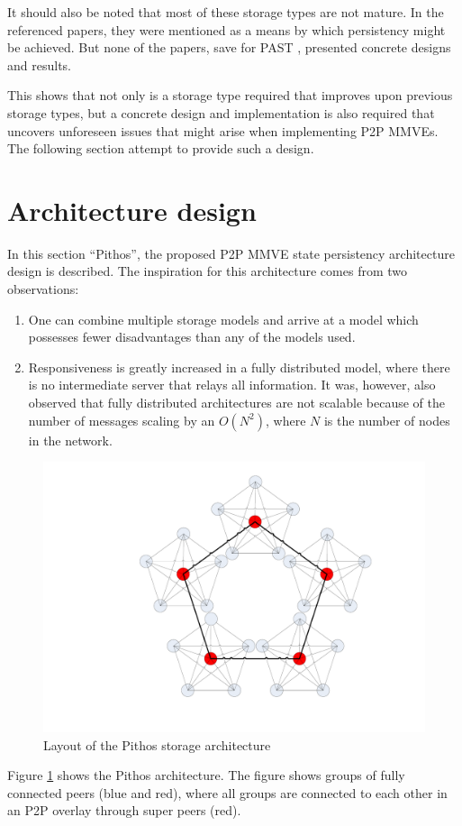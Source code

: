 \documentclass[10pt,a4paper,conference]{IEEEtran}
\begin{document}
It should also be noted that most of these storage types are not mature. In the referenced papers, they were mentioned as a means by which
persistency might be achieved. But none of the papers, save for PAST \cite{PAST_storage}, presented concrete designs and results.

This shows that not only is a storage type required that improves upon previous storage types, but a concrete design and implementation is also
required that uncovers unforeseen issues that might arise when implementing P2P MMVEs. The following section attempt to provide such a design.

\section{Architecture design}
\label{design}

In this section ``Pithos'', the proposed P2P MMVE state persistency architecture design is described. The inspiration for this architecture comes
from two observations:
%
\begin{enumerate}
  \item One can combine multiple storage models and arrive at a model which possesses fewer disadvantages than any of the models used.
  \item Responsiveness is greatly increased in a fully distributed model, where there is no intermediate server that relays all information. It
      was, however, also observed that fully distributed architectures are not scalable because of the number of messages scaling by an $O(N^2)$,
      where $N$ is the number of nodes in the network.
\end{enumerate}

\begin{figure}[htbp]
 \centering
 \includegraphics[clip=true, viewport=7.5cm 2.5cm 26cm 20cm, width=0.7\columnwidth]{CDHT_layout}
 \caption{Layout of the Pithos storage architecture}
 \label{fig_pithos}
\end{figure}
%
Figure \ref{fig_pithos} shows the Pithos architecture. The figure shows groups of fully connected peers (blue and red), where all groups are
connected to each other in an P2P overlay through super peers (red).
\end{document}
